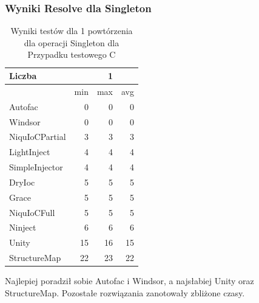 \documentclass[12pt]{article}
\begin{document}
\subsubsection{Wyniki Resolve dla Singleton}
\begin{table}[H]
\captionsetup{belowskip=0pt,aboveskip=0pt}
\begin{center}
\begin{small}
	\begin{tabular}{ | l | r r r | }
    		\hline
Liczba & & 1 & \\ \hline
 & min & max & avg \\ \hline
Autofac & 0 & 0 & 0 \\ \hline
Windsor & 0 & 0 & 0 \\ \hline
NiquIoCPartial & 3 & 3 & 3 \\ \hline
LightInject & 4 & 4 & 4 \\ \hline
SimpleInjector & 4 & 4 & 4 \\ \hline
DryIoc & 5 & 5 & 5 \\ \hline
Grace & 5 & 5 & 5 \\ \hline
NiquIoCFull & 5 & 5 & 5 \\ \hline
Ninject & 6 & 6 & 6 \\ \hline
Unity & 15 & 16 & 15 \\ \hline
StructureMap & 22 & 23 & 22 \\ \hline
  	\end{tabular}
\end{small}
\end{center}
\caption{Wyniki testów dla 1 powtórzenia dla operacji Singleton dla Przypadku testowego C}
\label{TestCaseC_Singleton1}
\end{table}
Najlepiej poradził sobie Autofac i Windsor, a najsłabiej Unity oraz StructureMap. Pozostałe rozwiązania zanotowały zbliżone czasy.
\\ \\
\end{document}
